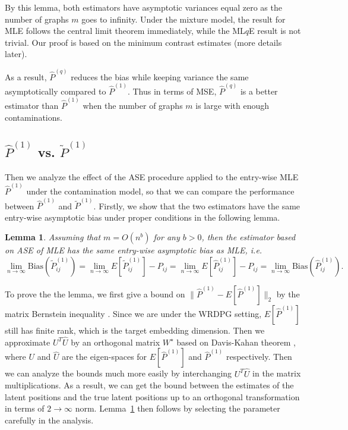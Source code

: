 \documentclass[a4paper]{article}
\newtheorem{lemma}[fact]{Lemma}
\renewcommand{\hat}{\widehat}
\begin{document}
By this lemma, both estimators have asymptotic variances equal zero as the number of graphs $m$ goes to infinity. Under the mixture model, the result for MLE follows the central limit theorem immediately, while the ML$q$E result is not trivial. Our proof is based on the minimum contrast estimates (more details later).

As a result, $\hat{P}^{(q)}$ reduces the bias while keeping variance the same asymptotically compared to $\hat{P}^{(1)}$. Thus in terms of MSE, $\hat{P}^{(q)}$ is a better estimator than $\hat{P}^{(1)}$ when the number of graphs $m$ is large with enough contaminations.

\subsection{$\hat{P}^{(1)}$ vs. $\widetilde{P}^{(1)}$}
Then we analyze the effect of the ASE procedure applied to the entry-wise MLE $\hat{P}^{(1)}$ under the contamination model, so that we can compare the performance between $\hat{P}^{(1)}$ and $\widetilde{P}^{(1)}$. Firstly, we show that the two estimators have the same entry-wise asymptotic bias under proper conditions in the following lemma.

\begin{lemma}
\label{lm:L1Consistent}
Assuming that $m = O(n^b)$ for any $b > 0$, then the estimator based on ASE of MLE has the same entry-wise asymptotic bias as MLE, i.e.
\[
	\lim_{n \to \infty} \mathrm{Bias}(\widetilde{P}_{ij}^{(1)}) = \lim_{n \to \infty} E[\widetilde{P}_{ij}^{(1)}] - P_{ij} = \lim_{n \to \infty} E[\hat{P}^{(1)}_{ij}] - P_{ij}
    = \lim_{n \to \infty} \mathrm{Bias}(\hat{P}_{ij}^{(1)}).
\]
\end{lemma}

To prove the the lemma, we first give a bound on $\|\hat{P}^{(1)} - E[\hat{P}^{(1)}]\|_2$ by the matrix Bernstein inequality \citep{tropp2012user}. Since we are under the WRDPG setting, $E[\hat{P}^{(1)}]$ still has finite rank, which is the target embedding dimension. Then we approximate $U^T \hat{U}$ by an orthogonal matrix $W^{\star}$ based on Davis-Kahan theorem \citep{davis1970rotation}, where $U$ and $\hat{U}$ are the eigen-spaces for $E[\hat{P}^{(1)}]$ and $\hat{P}^{(1)}$ respectively. Then we can analyze the bounds much more easily by interchanging $U^T \hat{U}$ in the matrix multiplications. As a result, we can get the bound between the estimates of the latent positions and the true latent positions up to an orthogonal transformation in terms of $2 \to \infty$ norm. Lemma~\ref{lm:L1Consistent} then follows by selecting the parameter carefully in the analysis.
\end{document}
